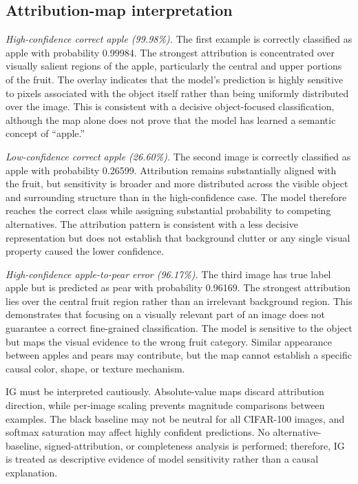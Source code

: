 \documentclass[conference]{IEEEtran}
\begin{document}
\subsection{Attribution-map interpretation}

\textit{High-confidence correct apple (99.98\%).}
The first example is correctly classified as apple with probability 0.99984. The strongest attribution is concentrated over visually salient regions of the apple, particularly the central and upper portions of the fruit. The overlay indicates that the model's prediction is highly sensitive to pixels associated with the object itself rather than being uniformly distributed over the image. This is consistent with a decisive object-focused classification, although the map alone does not prove that the model has learned a semantic concept of ``apple.''

\textit{Low-confidence correct apple (26.60\%).}
The second image is correctly classified as apple with probability 0.26599. Attribution remains substantially aligned with the fruit, but sensitivity is broader and more distributed across the visible object and surrounding structure than in the high-confidence case. The model therefore reaches the correct class while assigning substantial probability to competing alternatives. The attribution pattern is consistent with a less decisive representation but does not establish that background clutter or any single visual property caused the lower confidence.

\textit{High-confidence apple-to-pear error (96.17\%).}
The third image has true label apple but is predicted as pear with probability 0.96169. The strongest attribution lies over the central fruit region rather than an irrelevant background region. This demonstrates that focusing on a visually relevant part of an image does not guarantee a correct fine-grained classification. The model is sensitive to the object but maps the visual evidence to the wrong fruit category. Similar appearance between apples and pears may contribute, but the map cannot establish a specific causal color, shape, or texture mechanism.

IG must be interpreted cautiously. Absolute-value maps discard attribution direction, while per-image scaling prevents magnitude comparisons between examples. The black baseline may not be neutral for all CIFAR-100 images, and softmax saturation may affect highly confident predictions. No alternative-baseline, signed-attribution, or completeness analysis is performed; therefore, IG is treated as descriptive evidence of model sensitivity rather than a causal explanation.
\end{document}
